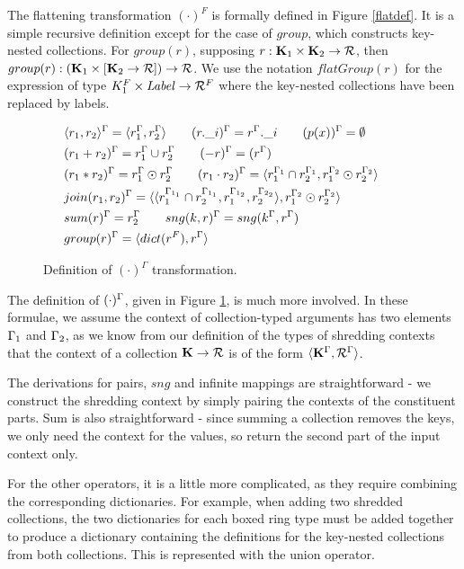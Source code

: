 {{{The flattening transformation $(\cdot)^F$ is formally defined in Figure \ref{flatdef}. It is a simple recursive definition except for the case of $group$, which constructs key-nested collections. For $group(r)$, supposing $r: \mathbf{K}_1 \times \mathbf{K}_2 \rightarrow \mathcal{R}$, then $group(r): (\mathbf{K}_1 \times [\mathbf{K}_2 \rightarrow \mathcal{R}]) \rightarrow \mathcal{R}$. We use the notation $flatGroup(r)$ for the expression of type $K_1^F\times \textrm{\textit{Label}} \rightarrow \mathcal{R}^F$ where the key-nested collections have been replaced by labels.

\begin{figure}
\begin{equation*}
\begin{aligned}
&\langle r_1, r_2 \rangle^\Gamma = \langle r_1^\Gamma, r_2^\Gamma \rangle \qquad (r.\_i)^\Gamma = r^\Gamma.\_i  \qquad (p(x))^\Gamma = \emptyset \\
&(r_1 + r_2)^\Gamma = r_1^\Gamma \cup r_2^\Gamma \qquad (-r)^\Gamma = (r^\Gamma) \\
&(r_1*r_2)^\Gamma = r_1^\Gamma \odot r_2^\Gamma \qquad (r_1 \cdot r_2)^\Gamma = \langle r_1^{\Gamma_1} \cap r_2^{\Gamma_1}, r_1^{\Gamma_2} \odot r_2^{\Gamma_2} \rangle  \\
&join(r_1,r_2)^\Gamma = \langle \langle r_1^{\Gamma_{1_1}} \cap r_2^{\Gamma_{1_1}}, r_1^{\Gamma_{1_2}},r_2^{\Gamma_{2_2}} \rangle, r_1^{\Gamma_2} \odot r_2^{\Gamma_2} \rangle \\&sum(r)^\Gamma = r^\Gamma_2 \qquad sng(k,r)^\Gamma = sng(k^\Gamma,r^\Gamma) \\
&group(r)^\Gamma = \langle dict(r^F), r^\Gamma \rangle \\
\end{aligned}
\qquad
\end{equation*}
\caption{Definition of $(\cdot)^\Gamma $ transformation.}
\label{contextdef}
\end{figure}

The definition of $(\cdot)^\Gamma$, given in Figure \ref{contextdef}, is much more involved. In these formulae, we assume the context of collection-typed arguments has two elements $\Gamma_1$ and $\Gamma_2$, as we know from our definition of the types of shredding contexts that the context of a collection $\mathbf{K} \rightarrow \mathcal{R}$ is of the form $\langle \mathbf{K}^\Gamma, \mathcal{R}^\Gamma \rangle$.

The derivations for pairs, $sng$ and infinite mappings are straightforward - we construct the shredding context by simply pairing the contexts of the constituent parts. Sum is also straightforward - since summing a collection removes the keys, we only need the context for the values, so return the second part of the input context only.

For the other operators, it is a little more complicated, as they require combining the corresponding dictionaries. For example, when adding two shredded collections, the two dictionaries for each boxed ring type must be added together to produce a dictionary containing the definitions for the key-nested collections from both collections. This is represented with the union operator.

}}}
